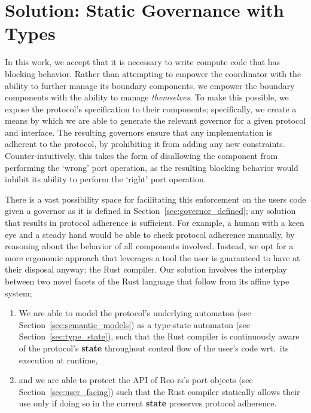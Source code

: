 \section{Solution: Static Governance with Types}
\label{sec:soluition_static_governance}
In this work, we accept that it is necessary to write compute code that has blocking behavior. Rather than attempting to empower the coordinator with the ability to further manage its boundary components, we empower the boundary components with the ability to manage \textit{themselves}. To make this possible, we expose the protocol's specification to their components; specifically, we create a means by which we are able to generate the relevant governor for a given protocol and interface. The resulting governors ensure that any implementation is adherent to the protocol, by prohibiting it from adding any new constraints. Counter-intuitively, this takes the form of disallowing the component from performing the `wrong' port operation, as the resulting blocking behavior would inhibit its ability to perform the `right' port operation.

There is a vast possibility space for facilitating this enforcement on the users code given a governor as it is defined in Section~\ref{sec:governor_defined}; any solution that results in protocol adherence is sufficient. For example, a human with a keen eye and a steady hand would be able to check protocol adherence manually, by reasoning about the behavior of all components involved. Instead, we opt for a more ergonomic approach that leverages a tool the user is guaranteed to have at their disposal anyway: the Rust compiler. Our solution involves the interplay between two novel facets of the Rust language that follow from its affine type system; 
\begin{enumerate}
	\item We are able to model the protocol's underlying automaton (see Section~\ref{sec:semantic_models}) as a type-state automaton (see Section~\ref{sec:type_state}), such that the Rust compiler is continuously aware of the protocol's \textbf{state} throughout control flow of the user's code wrt.\ its execution at runtime,
	
	\item and we are able to protect the API of Reo-rs's port objects (see Section~\ref{sec:user_facing}) such that the Rust compiler statically allows their use only if doing so in the current \textbf{state} preserves protocol adherence.
\end{enumerate}

